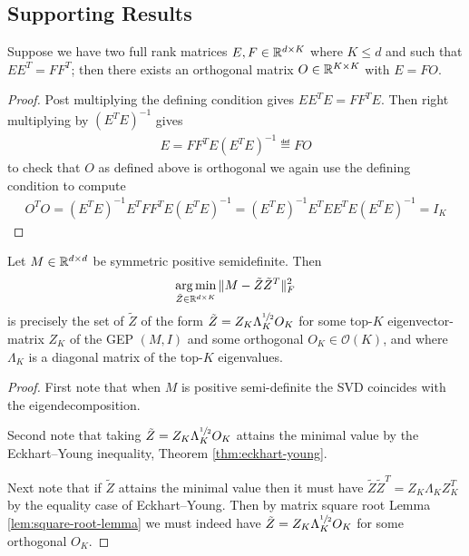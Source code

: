 \subsection{Supporting Results}
\begin{lemma}\label{lem:square-root-lemma}
Suppose we have two full rank matrices $E,F \in \mathbb{R}^{d \times K}$ where $K \leq d$ and such that $E E^T = F F^T$; then there exists an orthogonal matrix $O \in \mathbb{R}^{K \times K}$ with $E = FO$.
\end{lemma}
\begin{proof}
    Post multiplying the defining condition gives $E E^T E = F F^T E$.
    Then right multiplying by $(E^T E)^{-1}$ gives
    \begin{align*}
        E = F F^T E (E^T E)^{-1} \eqdef F O
    \end{align*}
    to check that $O$ as defined above is orthogonal we again use the defining condition to compute
    \begin{align*}
        O^T O = (E^T E)^{-1} E^T F F^T E (E^T E)^{-1} = (E^T E)^{-1} E^T E E^T E (E^T E)^{-1} = I_K
    \end{align*}
\end{proof}

\begin{corollary}\label{prop:psd-eckhart-young-factor}
Let $M \in \mathbb{R}^{d\times d}$ be symmetric positive semidefinite.
Then
\begin{align*}
    \operatorname*{arg\,min}_{\tilde{Z} \in \mathbb{R}^{d \times K}} \| M - \tilde{Z} \tilde{Z}^T \|_F^2
\end{align*}
is precisely the set of $\tilde{Z}$ of the form $\tilde{Z} = Z_K \Lambda_K^{\sfrac{1}{2}} O_K$ for some top-$K$ eigenvector-matrix $Z_K$ of the GEP $(M,I)$ and some orthogonal $O_K \in \mathcal{O}(K)$, and where $\Lambda_K$ is a diagonal matrix of the top-$K$ eigenvalues.
\end{corollary}
\begin{proof}
    First note that when $M$ is positive semi-definite the SVD coincides with the eigendecomposition.

    Second note that taking $\tilde{Z} = Z_K \Lambda_K^{\sfrac{1}{2}} O_K$ attains the minimal value by the Eckhart--Young inequality, Theorem \ref{thm:eckhart-young}.

    Next note that if $\tilde{Z}$ attains the minimal value then it must have $\tilde{Z} \tilde{Z}^T = Z_K \Lambda_K Z_K^T$ by the equality case of Eckhart--Young.
    Then by matrix square root Lemma \ref{lem:square-root-lemma} we must indeed have $\tilde{Z} = Z_K \Lambda_K^{\sfrac{1}{2}} O_K$ for some orthogonal $O_K$.
\end{proof}

